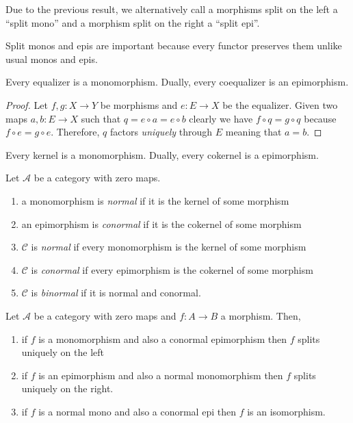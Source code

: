 \documentclass[12pt]{article}
\newcommand{\A}{\mathcal{A}}
\newcommand{\C}{\mathcal{C}}
\begin{document}
\begin{rmk}
Due to the previous result, we alternatively call a morphisms split on the left a ``split mono'' and a morphism split on the right a ``split epi''. 
\end{rmk}

\begin{rmk}
Split monos and epis are important because every functor preserves them unlike usual monos and epis.
\end{rmk}

\begin{lemma}
Every equalizer is a monomorphism. Dually, every coequalizer is an epimorphism.
\end{lemma}

\begin{proof}
Let $f, g : X \to Y$ be morphisms and $e : E \to X$ be the equalizer. Given two maps $a,b : E \to X$ such that $q = e \circ a = e \circ b$ clearly we have $f \circ q = g \circ q$ because $f \circ e = g \circ e$. Therefore, $q$ factors \textit{uniquely} through $E$ meaning that $a = b$.
\end{proof}

\begin{corollary}
Every kernel is a monomorphism. Dually, every cokernel is a epimorphism.
\end{corollary}

\begin{defn}
Let $\A$ be a category with zero maps.
\begin{enumerate}
\item a monomorphism is \textit{normal} if it is the kernel of some morphism
\item an epimorphism is \textit{conormal} if it is the cokernel of some morphism
\item $\C$ is \textit{normal} if every monomorphism is the kernel of some morphism
\item $\C$ is \textit{conormal} if every epimorphism is the cokernel of some morphism
\item $\C$ is \textit{binormal} if it is normal and conormal.
\end{enumerate}
\end{defn}

\begin{prop}
Let $\A$ be a category with zero maps and $f : A \to B$ a morphism. Then,
\begin{enumerate}
\item if $f$ is a monomorphism and also a conormal epimorphism then $f$ splits uniquely on the left
\item if $f$ is an epimorphism and also a normal monomorphism then $f$ splits uniquely on the right.
\item if $f$ is a normal mono and also a conormal epi then $f$ is an isomorphism.
\end{enumerate}
\end{prop}
\end{document}
